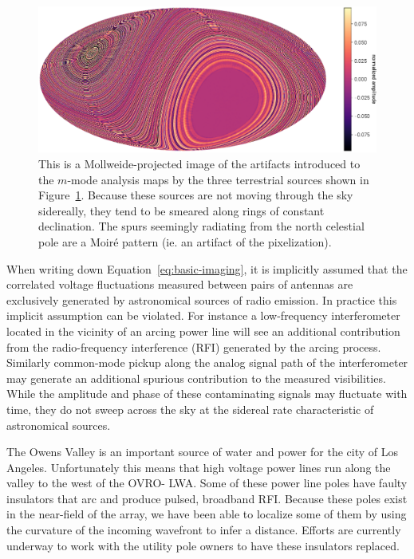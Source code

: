 \documentclass[twocolumn]{aastex61}
\begin{document}
\begin{figure}[t]
    \centering
    \includegraphics[height=0.32\textheight]{figures/terrestrial-interference/rings}
    \caption{
        This is a Mollweide-projected image of the artifacts introduced to the $m$-mode analysis
        maps by the three terrestrial sources shown in Figure~\ref{fig:rings}. Because these sources
        are not moving through the sky sidereally, they tend to be smeared along rings of constant
        declination. The spurs seemingly radiating from the north celestial pole are a Moir\'{e}
        pattern (ie. an artifact of the pixelization).
    }
    \label{fig:rings}
\end{figure}


When writing down Equation~\ref{eq:basic-imaging}, it is implicitly assumed that the correlated
voltage fluctuations measured between pairs of antennas are exclusively generated by astronomical
sources of radio emission. In practice this implicit assumption can be violated. For instance a
low-frequency interferometer located in the vicinity of an arcing power line will see an additional
contribution from the radio-frequency interference (RFI) generated by the arcing process. Similarly
common-mode pickup along the analog signal path of the interferometer may generate an additional
spurious contribution to the measured visibilities. While the amplitude and phase of these
contaminating signals may fluctuate with time, they do not sweep across the sky at the sidereal rate
characteristic of astronomical sources.

The Owens Valley is an important source of water and power for the city of Los Angeles.
Unfortunately this means that high voltage power lines run along the valley to the west of the OVRO-
LWA. Some of these power line poles have faulty insulators that arc and produce pulsed, broadband
RFI. Because these poles exist in the near-field of the array, we have been able to localize some of
them by using the curvature of the incoming wavefront to infer a distance. Efforts are currently
underway to work with the utility pole owners to have these insulators replaced.
\end{document}
